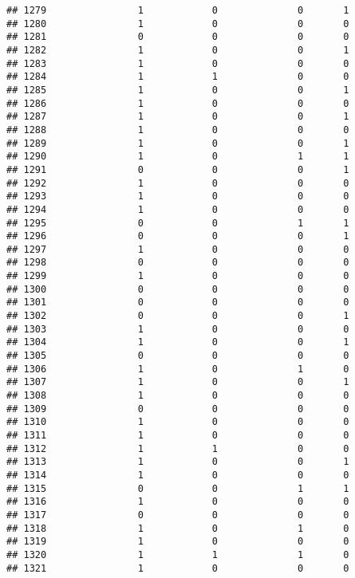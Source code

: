 \documentclass[]{article}
\begin{document}
\begin{verbatim}
## 1279                1            0              0       1
## 1280                1            0              0       0
## 1281                0            0              0       0
## 1282                1            0              0       1
## 1283                1            0              0       0
## 1284                1            1              0       0
## 1285                1            0              0       1
## 1286                1            0              0       0
## 1287                1            0              0       1
## 1288                1            0              0       0
## 1289                1            0              0       1
## 1290                1            0              1       1
## 1291                0            0              0       1
## 1292                1            0              0       0
## 1293                1            0              0       0
## 1294                1            0              0       0
## 1295                0            0              1       1
## 1296                0            0              0       1
## 1297                1            0              0       0
## 1298                0            0              0       0
## 1299                1            0              0       0
## 1300                0            0              0       0
## 1301                0            0              0       0
## 1302                0            0              0       1
## 1303                1            0              0       0
## 1304                1            0              0       1
## 1305                0            0              0       0
## 1306                1            0              1       0
## 1307                1            0              0       1
## 1308                1            0              0       0
## 1309                0            0              0       0
## 1310                1            0              0       0
## 1311                1            0              0       0
## 1312                1            1              0       0
## 1313                1            0              0       1
## 1314                1            0              0       0
## 1315                0            0              1       1
## 1316                1            0              0       0
## 1317                0            0              0       0
## 1318                1            0              1       0
## 1319                1            0              0       0
## 1320                1            1              1       0
## 1321                1            0              0       0

\end{verbatim}
\end{document}
